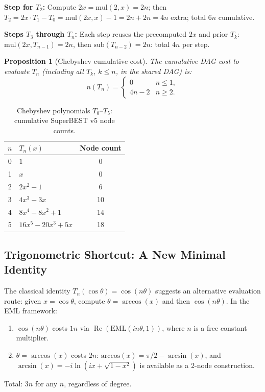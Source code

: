 \documentclass[11pt,a4paper]{article}
\newtheorem{proposition}[theorem]{Proposition}
\begin{document}
\textbf{Step for $T_2$:} Compute $2x = \mathrm{mul}(2, x) = 2n$; then
$T_2 = 2x \cdot T_1 - T_0 = \mathrm{mul}(2x, x) - 1 = 2n + 2n = 4n$ extra;
total $6n$ cumulative.

\textbf{Steps $T_3$ through $T_n$:} Each step reuses the precomputed $2x$ and prior $T_k$:
$\mathrm{mul}(2x, T_{n-1}) = 2n$, then $\mathrm{sub}(T_{n-2}) = 2n$: total $4n$ per step.

\begin{proposition}[Chebyshev cumulative cost]
\label{prop:cheb}
  The cumulative DAG cost to evaluate $T_n$ (including all $T_k$, $k \leq n$, in the
  shared DAG) is:
  \[
    n(T_n) = \begin{cases} 0 & n \leq 1, \\ 4n - 2 & n \geq 2. \end{cases}
  \]
\end{proposition}

\begin{table}[h]
\centering
\caption{Chebyshev polynomials $T_0$--$T_5$: cumulative SuperBEST v5 node counts.}
\label{tab:chebyshev}
\begin{tabular}{clc}
\toprule
$n$ & $T_n(x)$ & Node count \\
\midrule
0 & $1$               & 0 \\
1 & $x$               & 0 \\
2 & $2x^2 - 1$        & 6 \\
3 & $4x^3 - 3x$       & 10 \\
4 & $8x^4 - 8x^2 + 1$ & 14 \\
5 & $16x^5 - 20x^3 + 5x$ & 18 \\
\bottomrule
\end{tabular}
\end{table}

\subsection{Trigonometric Shortcut: A New Minimal Identity}

The classical identity $T_n(\cos\theta) = \cos(n\theta)$ suggests an alternative evaluation
route: given $x = \cos\theta$, compute $\theta = \arccos(x)$ and then $\cos(n\theta)$.
In the EML framework:
\begin{enumerate}
  \item $\cos(n\theta)$ costs $1n$ via $\operatorname{Re}(\mathrm{EML}(in\theta, 1))$, where $n$ is a
        free constant multiplier.
  \item $\theta = \arccos(x)$ costs $2n$: $\mathrm{arccos}(x) = \pi/2 - \arcsin(x)$,
        and $\arcsin(x) = -i \ln(ix + \sqrt{1-x^2})$ is available as a 2-node construction.
\end{enumerate}
Total: $3n$ for any $n$, regardless of degree.
\end{document}
